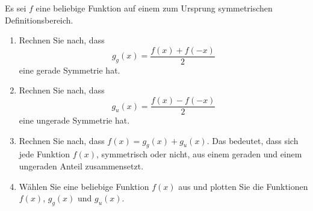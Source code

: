 \begin{ExerciseBlock}
Es sei $f$ eine beliebige Funktion auf einem zum Ursprung symmetrischen Definitionsbereich.
\begin{enumerate}[label=\alph*)]
	\item Rechnen Sie nach, dass 
\[\displaystyle g_g(x) = \frac{f(x)+f(-x)}{2}\] eine gerade Symmetrie hat.

	\item Rechnen Sie nach, dass 
\[\displaystyle g_u(x) = \frac{f(x)-f(-x)}{2}\] eine ungerade Symmetrie hat.

	\item Rechnen Sie nach, dass $\displaystyle f(x) = g_g(x) + g_u(x)$. Das bedeutet, dass sich jede Funktion $f(x)$, symmetrisch oder nicht, aus einem geraden und einem ungeraden Anteil zusammensetzt.

	\item Wählen Sie eine beliebige Funktion $f(x)$ aus und plotten Sie die Funktionen $f(x)$, $g_g(x)$ und $g_u(x)$.

\end{enumerate}

\end{ExerciseBlock}
